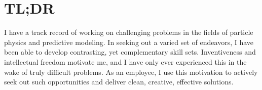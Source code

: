 \section{\textbf{TL;DR}}
	I have a track record of working on challenging problems in the fields of particle physics and predictive modeling. In seeking out a varied set of endeavors, I have been able to develop contrasting, yet complementary skill sets. Inventiveness and intellectual freedom motivate me, and I have only ever experienced this in the wake of truly difficult problems. As an employee, I use this motivation to actively seek out such opportunities and deliver clean, creative, effective solutions.